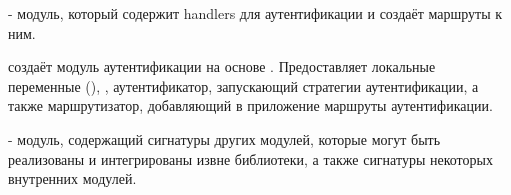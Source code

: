 \medbreak
\label{page-FPauth-core-module-FPauth+u+core-module-Router}\begin{ocamlindent} - модуль, который содержит handlers для аутентификации и создаёт маршруты к ним.\end{ocamlindent}%
\medbreak
\label{page-FPauth-core-module-FPauth+u+core-module-Make+u+Auth}\begin{ocamlindent} создаёт модуль аутентификации на основе \hyperref[page-FPauth-core-module-FPauth+u+core-module-Auth+u+sign-module-type-MODEL]{}. Предоставляет локальные переменные (), , аутентификатор, запускающий стратегии аутентификации, а также маршрутизатор, добавляющий в приложение маршруты аутентификации.\end{ocamlindent}%
\medbreak
\label{page-FPauth-core-module-FPauth+u+core-module-Auth+u+sign}\begin{ocamlindent} - модуль, содержащий сигнатуры других модулей, которые могут быть реализованы и интегрированы извне библиотеки, а также сигнатуры некоторых внутренних модулей.\end{ocamlindent}%
\medbreak


% 
% 
% 
% 
% 

